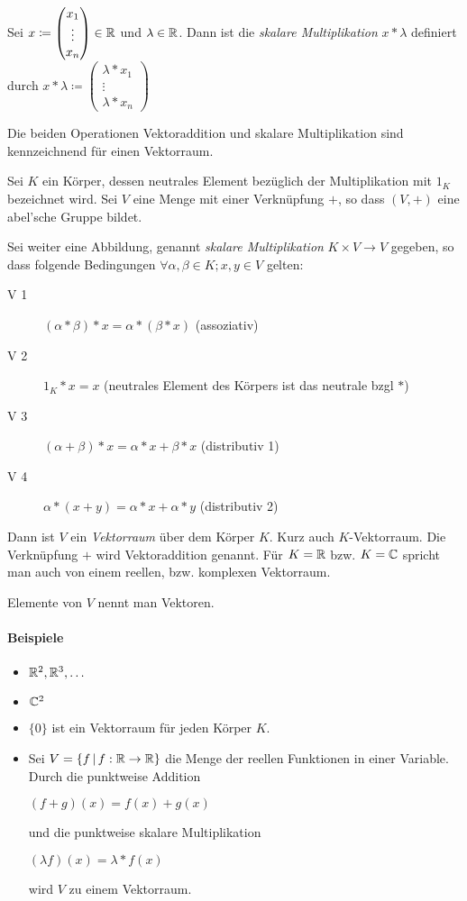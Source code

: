 Sei $x\coloneq \begin{pmatrix}
  x_1\\
  \vdots\\
  x_n
\end{pmatrix} \in \mathbb{R}$ und $\lambda\in\mathbb{R}$. Dann ist die \emph{skalare Multiplikation} $x*\lambda$ definiert durch $x*\lambda \coloneqq \begin{pmatrix}
  \lambda* x_1\\
  \vdots\\
  \lambda* x_n
\end{pmatrix}$

Die beiden Operationen Vektoraddition und skalare Multiplikation sind kennzeichnend für einen Vektorraum.


Sei $K$ ein Körper, dessen neutrales Element bezüglich der Multiplikation mit $1_K$ bezeichnet wird. Sei $V$ eine Menge mit einer Verknüpfung $+$, so dass $(V,+)$ eine abel'sche Gruppe bildet.

Sei weiter eine Abbildung, genannt \emph{skalare Multiplikation} $K\times V\rightarrow V$ gegeben, so dass folgende Bedingungen $\forall \alpha,\beta \in K; x,y\in V$ gelten:

\begin{description}
  \item[V 1] $(\alpha*\beta)* x=\alpha*(\beta* x)$ (assoziativ)
  \item[V 2] $1_K* x = x$ (neutrales Element des Körpers ist das neutrale bzgl $*$)
  \item[V 3] $(\alpha+\beta)* x=\alpha * x + \beta* x$ (distributiv 1)
  \item[V 4] $\alpha* (x+y)=\alpha * x + \alpha* y$ (distributiv 2)
\end{description}
Dann ist $V$ ein \emph{Vektorraum} über dem Körper $K$. Kurz auch $K$-Vektorraum. Die Verknüpfung $+$ wird Vektoraddition genannt. Für $K=\mathbb{R}$ bzw. $K=\mathbb{C}$ spricht man auch von einem reellen, bzw. komplexen Vektorraum.

Elemente von $V$ nennt man Vektoren.

\paragraph{Beispiele}
\begin{multicols}{2}
  \begin{itemize}
    \item $\mathbb{R}^2, \mathbb{R}^3, \ldots$
    \item $\mathbb{C}^2$
    \item $\{0\}$ ist ein Vektorraum für jeden Körper $K$.
    \columnbreak
    \item Sei $V=\left\{ f \,\middle|\, f:\mathbb{R}\rightarrow\mathbb{R} \right\}$ die Menge der reellen Funktionen in einer Variable. Durch die punktweise Addition

    $(f+g)(x)=f(x)+g(x)$

    und die punktweise skalare Multiplikation

    $(\lambda f)(x)=\lambda* f(x)$

    wird $V$ zu einem Vektorraum.
  \end{itemize}
\end{multicols}


